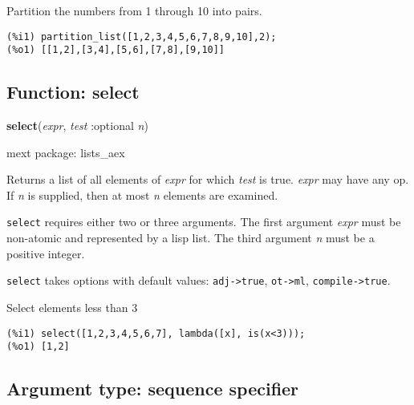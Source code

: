 \documentclass[]{article}
\begin{document}
\vspace{5 pt}


   Partition the numbers from 1 through 10 into pairs. 

\begin{Verbatim}[frame=single]
(%i1) partition_list([1,2,3,4,5,6,7,8,9,10],2);
(%o1) [[1,2],[3,4],[5,6],[7,8],[9,10]]
\end{Verbatim}


\subsection{Function: select\label{sec:select}}
\hypertarget{select}{}
{\bf select}({\it expr}, {\it test} :optional {\it n})


\noindent mext package: lists\_aex



\vspace{5 pt}
Returns a list of all elements of {\it expr} for which {\it test} is true. {\it expr} may have any op. If {\it n} is supplied, then at most {\it n} elements are examined. 

\vspace{5 pt}

   {\tt select} requires either two or three arguments.
    The first argument {\it expr} must be non-atomic and represented by a lisp list.
    The third argument {\it n} must be a positive integer.


\vspace{5 pt}

{\tt select} takes options with default values: {\tt adj->true}, {\tt ot->ml}, {\tt compile->true}.
\vspace{5 pt}


   Select elements less than 3 

\begin{Verbatim}[frame=single]
(%i1) select([1,2,3,4,5,6,7], lambda([x], is(x<3)));
(%o1) [1,2]
\end{Verbatim}


\subsection{Argument type: sequence specifier\label{sec:sequence specifier}}
\hypertarget{sequence specifier}{}
\end{document}
